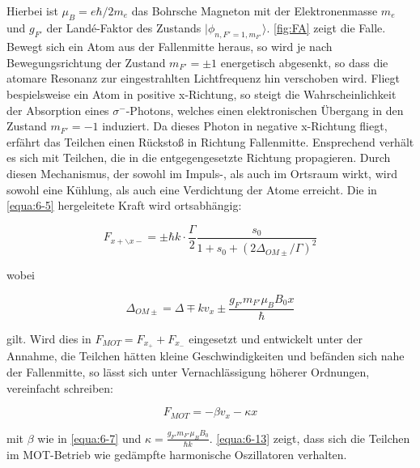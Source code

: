 \documentclass[
class=book,
accentcolor=1b,
custommargins=geometry,
fontsize=11pt,
thesis={type=Versuchsanleitung},
ruledheaders=all,
headline=false,
instbox=false,
marginpar=false,
title=small,
ignore-missing-data=true,
twoside=false,
pdfa=false %
]{apqpub}
\begin{document}
				Hierbei ist $\mu_B = e \hbar / 2 m_e$ das Bohrsche Magneton mit der Elektronenmasse $m_e$ und $g_{F'}$ der Landé-Faktor des Zustands $\lvert \phi_{n,F'=1,m_{F'}}\rangle$. \autoref{fig:FA} zeigt die Falle. Bewegt sich ein Atom aus der Fallenmitte heraus, so wird je nach Bewegungsrichtung der Zustand $m_{F'} = \pm 1$ energetisch abgesenkt, so dass die atomare Resonanz zur eingestrahlten Lichtfrequenz hin verschoben wird. Fliegt bespielsweise ein Atom in positive x-Richtung, so steigt die Wahrscheinlichkeit der Absorption eines $\sigma^-$-Photons, welches einen elektronischen Übergang in den Zustand $m_{F'} = -1$ induziert. Da dieses Photon in negative x-Richtung fliegt, erfährt das Teilchen einen Rückstoß in Richtung
				Fallenmitte. Ensprechend verhält es sich mit Teilchen, die in die entgegengesetzte Richtung propagieren.
				Durch diesen Mechanismus, der sowohl im Impuls-, als auch im Ortsraum wirkt, wird sowohl eine Kühlung, als
				auch eine Verdichtung der Atome erreicht. Die in \autoref{equa:6-5} hergeleitete Kraft wird ortsabhängig:
				
				\begin{equation}\label{equa:6-11}
				F_{x+\backslash x-} = \pm \hbar k \cdot \frac{\varGamma}{2} \frac{s_0}{1+s_0+(2\varDelta_{OM\pm}/\varGamma)^2} 
				\end{equation}
				
				wobei
				
				\begin{equation}
				\varDelta_{OM\pm} = \varDelta \mp k v_{x} \pm \frac{g_{F'} m_{F'} \mu_B B_0 x}{\hbar}
				\end{equation}
				
				gilt. Wird dies in $F_{MOT} = F_{x_+} + F_{x_-}$ eingesetzt und entwickelt unter der Annahme, die Teilchen hätten kleine Geschwindigkeiten und befänden sich nahe der Fallenmitte, so lässt sich unter Vernachlässigung höherer Ordnungen, vereinfacht schreiben:
				
				\begin{equation}\label{equa:6-13}
				F_{MOT} = -\beta v_x  -\kappa x
				\end{equation}
				
				mit $\beta$ wie in \autoref{equa:6-7} und $\kappa = \frac{g_{F'} m_{F'} \mu_B B_0}{\hbar k}$. \autoref{equa:6-13} zeigt, dass sich die Teilchen im MOT-Betrieb wie gedämpfte harmonische Oszillatoren verhalten.\\
				
\end{document}
